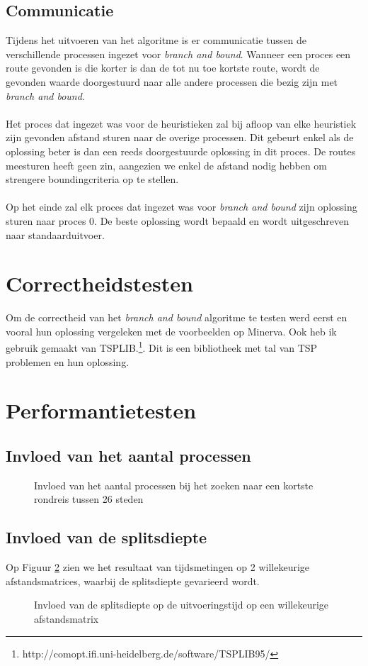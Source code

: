 \documentclass[12pt]{article}
\begin{document}
\subsection{Communicatie}
Tijdens het uitvoeren van het algoritme is er communicatie tussen de verschillende processen ingezet voor \textit{branch and bound}.
Wanneer een proces een route gevonden is die korter is dan de tot nu toe kortste route, wordt de gevonden waarde doorgestuurd naar alle andere processen die bezig zijn met \textit{branch and bound}.
\\
\\
Het proces dat ingezet was voor de heuristieken zal bij afloop van elke heuristiek zijn gevonden afstand sturen naar de overige processen.
Dit gebeurt enkel als de oplossing beter is dan een reeds doorgestuurde oplossing in dit proces.
De routes meesturen heeft geen zin, aangezien we enkel de afstand nodig hebben om strengere boundingcriteria op te stellen.
\\
\\
Op het einde zal elk proces dat ingezet was voor \textit{branch and bound} zijn oplossing sturen naar proces 0. De beste oplossing wordt bepaald en wordt uitgeschreven naar standaarduitvoer.
\section{Correctheidstesten}
Om de correctheid van het \textit{branch and bound} algoritme te testen werd eerst en vooral hun oplossing vergeleken met de voorbeelden op Minerva. Ook heb ik gebruik gemaakt van TSPLIB.\footnote{http://comopt.ifi.uni-heidelberg.de/software/TSPLIB95/}. Dit is een bibliotheek met tal van TSP problemen en hun oplossing.
\section{Performantietesten}
\subsection{Invloed van het aantal processen}
\begin{figure}[H]
  \begin{center}
    
    \caption{Invloed van het aantal processen bij het zoeken naar een kortste rondreis tussen 26 steden}
    \label{graph:graph1}
  \end{center}
\end{figure}
\subsection{Invloed van de splitsdiepte}
Op Figuur \ref{splitsdiepte} zien we het resultaat van tijdsmetingen op 2 willekeurige afstandsmatrices, waarbij de splitsdiepte gevarieerd wordt.  
\begin{figure}[H]
\centering
\subfigure[21 steden]{
 \scalebox{.6}{}
}
\subfigure[19 steden]{
   \scalebox{.6}{}
}
\caption{Invloed van de splitsdiepte op de uitvoeringstijd op een willekeurige afstandsmatrix}
\label{splitsdiepte}
\end{figure}
\end{document}

